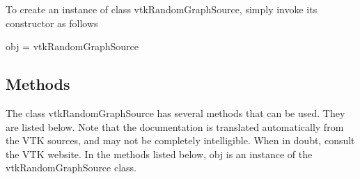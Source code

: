 To create an instance of class vtk\-Random\-Graph\-Source, simply invoke its constructor as follows \begin{DoxyVerb}  obj = vtkRandomGraphSource
\end{DoxyVerb}
 \hypertarget{vtkwidgets_vtkxyplotwidget_Methods}{}\subsection{Methods}\label{vtkwidgets_vtkxyplotwidget_Methods}
The class vtk\-Random\-Graph\-Source has several methods that can be used. They are listed below. Note that the documentation is translated automatically from the V\-T\-K sources, and may not be completely intelligible. When in doubt, consult the V\-T\-K website. In the methods listed below, {\ttfamily obj} is an instance of the vtk\-Random\-Graph\-Source class. 
